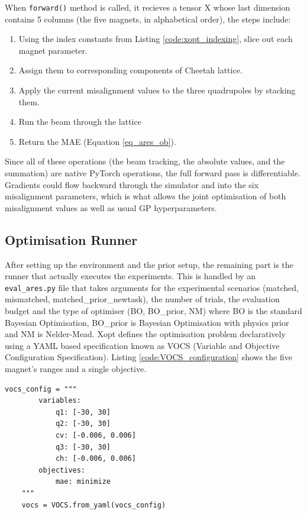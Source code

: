 When \texttt{forward()} method is called, it recieves a tensor X whose last dimension contains 5 columns (the five magnets, in alphabetical order), the steps include:
\begin{enumerate}
    \item Using the index constants from Listing \ref{code:xopt_indexing}, slice out each magnet parameter. 
    \item Assign them to corresponding components of Cheetah lattice.
    \item Apply the current misalignment values to the three quadrupoles by stacking them.
    \item Run the beam through the lattice
    \item Return the MAE (Equation \ref{eq_ares_ob}).
\end{enumerate}
Since all of these operations (the beam tracking, the absolute values, and the summation) are native PyTorch operations, the full forward pass is differentiable. 
Gradients could flow backward through the simulator and into the six misalignment parameters, which is what allows the joint optimisation of both misalignment 
values as well as usual GP hyperparameters.

\subsection{Optimisation Runner}

After setting up the environment and the prior setup, the remaining part is the runner that actually executes the experiments. This is handled by an \texttt{eval\_ares.py} file 
that takes arguments for the experimental scenarios (matched, mismatched, matched\_prior\_newtask), the number of trials, the evaluation budget and the type of optimiser (BO, BO\_prior, NM) 
where BO is the standard Bayesian Optimisation, BO\_prior is Bayesian Optimisation with physics prior and NM is Nelder-Mead. Xopt defines the optimisation problem declaratively using a 
YAML based specification known as VOCS (Variable and Objective Configuration Specification). Listing \ref{code:VOCS_configuration}  shows the five magnet's ranges and a single objective.


\begin{lstlisting}[caption={VOCS configuration.}, label={code:VOCS_configuration}]
vocs_config = """
        variables:
            q1: [-30, 30]
            q2: [-30, 30]
            cv: [-0.006, 0.006]
            q3: [-30, 30]
            ch: [-0.006, 0.006]
        objectives:
            mae: minimize
    """
    vocs = VOCS.from_yaml(vocs_config)
\end{lstlisting}

